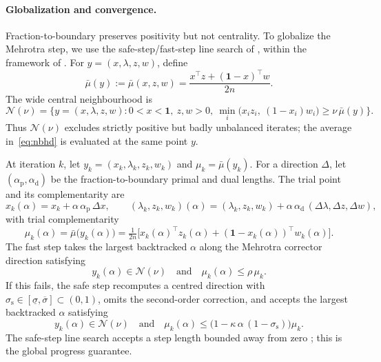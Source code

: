\documentclass[12pt]{article}
\newcommand{\cN}{\mathcal{N}}
\begin{document}
\paragraph{Globalization and convergence.} Fraction-to-boundary preserves
positivity but not centrality. To globalize the Mehrotra step, we use the
safe-step/fast-step line search of
\citet{wright1996superlinear,ralph2000superlinear}, within the framework of
\citet{kojima1994global}. For $y=(x,\lambda,z,w)$, define
\begin{equation}\label{eq:mu-bar}
    \bar\mu(y)
    :=\bar\mu(x,z,w)
    =\frac{x^\top z+(\mathbf 1-x)^\top w}{2n}.
\end{equation}
The wide central neighbourhood is
\begin{equation}\label{eq:nbhd}
    \cN(\nu)=\bigl\{y=(x,\lambda,z,w):0<x<\mathbf 1,\ z,w>0,\
        \min_i\bigl(x_iz_i,\ (1-x_i)w_i\bigr)\ge\nu\,\bar\mu(y)\bigr\}.
\end{equation}
Thus $\cN(\nu)$ excludes strictly positive but badly unbalanced iterates; the
average in~\eqref{eq:nbhd} is evaluated at the same point $y$.

At iteration $k$, let $y_k=(x_k,\lambda_k,z_k,w_k)$ and
$\mu_k=\bar\mu(y_k)$. For a direction $\Delta$, let
$(\alpha_{\mathrm p},\alpha_{\mathrm d})$ be the fraction-to-boundary primal and
dual lengths. The trial point and its complementarity are
\begin{equation}\label{eq:trial-point}
    x_k(\alpha)=x_k+\alpha\,\alpha_{\mathrm p}\,\Delta x,\qquad
    (\lambda_k,z_k,w_k)(\alpha)
    =(\lambda_k,z_k,w_k)+\alpha\,\alpha_{\mathrm d}\,(\Delta\lambda,\Delta z,\Delta w),
\end{equation}
with trial complementarity
\begin{equation}\label{eq:mu-alpha}
    \mu_k(\alpha)=\bar\mu\bigl(y_k(\alpha)\bigr)
    =\tfrac{1}{2n}\bigl[x_k(\alpha)^\top z_k(\alpha)
      +(\mathbf 1-x_k(\alpha))^\top w_k(\alpha)\bigr].
\end{equation}
The fast step takes the largest backtracked $\alpha$ along the Mehrotra corrector
direction satisfying
\begin{equation}\label{eq:fast-step}
    y_k(\alpha)\in\cN(\nu)\quad\text{and}\quad \mu_k(\alpha)\le\rho\,\mu_k.
\end{equation}
If this fails, the safe step recomputes a centred direction with
$\sigma_{\mathrm s}\in[\underline\sigma,\overline\sigma]\subset(0,1)$, omits the
second-order correction, and accepts the largest backtracked $\alpha$ satisfying
\begin{equation}\label{eq:safe-step}
    y_k(\alpha)\in\cN(\nu)
    \quad\text{and}\quad
    \mu_k(\alpha)\le\bigl(1-\kappa\,\alpha\,(1-\sigma_{\mathrm s})\bigr)\mu_k.
\end{equation}
The safe-step line search accepts a step length bounded away from zero
\citep[Lemmas~3.1--3.2]{wright1996superlinear}; this is the global progress
guarantee.
\end{document}
